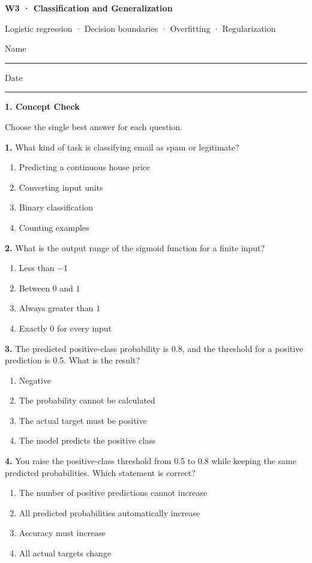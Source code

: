 \documentclass[11pt,a4paper]{article}
\newcommand{\parttitle}[2]{{\large\bfseries\color{ink} #1}\par{\small #2}\par\vspace{5mm}}
\newcommand{\question}[2]{\textbf{#1.} #2\par}
\begin{document}
{\LARGE\bfseries\color{ink} W3 · Classification and Generalization}\par
{\small Logistic regression · Decision boundaries · Overfitting · Regularization}\par
\vspace{3mm}Name\enspace\rule{43mm}{0.3pt}\hfill Date\enspace\rule{35mm}{0.3pt}\par\vspace{3mm}
\parttitle{1. Concept Check}{Choose the single best answer for each question.}
\question{1}{What kind of task is classifying email as spam or legitimate?}
\begin{enumerate}[label=(\arabic*),leftmargin=9mm,itemsep=0pt,topsep=2pt,parsep=0pt]
\item Predicting a continuous house price
\item Converting input units
\item Binary classification
\item Counting examples
\end{enumerate}\vfill
\question{2}{What is the output range of the sigmoid function for a finite input?}
\begin{enumerate}[label=(\arabic*),leftmargin=9mm,itemsep=0pt,topsep=2pt,parsep=0pt]
\item Less than $-1$
\item Between $0$ and $1$
\item Always greater than $1$
\item Exactly $0$ for every input
\end{enumerate}\vfill
\question{3}{The predicted positive-class probability is 0.8, and the threshold for a positive prediction is 0.5. What is the result?}
\begin{enumerate}[label=(\arabic*),leftmargin=9mm,itemsep=0pt,topsep=2pt,parsep=0pt]
\item Negative
\item The probability cannot be calculated
\item The actual target must be positive
\item The model predicts the positive class
\end{enumerate}\vfill
\question{4}{You raise the positive-class threshold from 0.5 to 0.8 while keeping the same predicted probabilities. Which statement is correct?}
\begin{enumerate}[label=(\arabic*),leftmargin=9mm,itemsep=0pt,topsep=2pt,parsep=0pt]
\item The number of positive predictions cannot increase
\item All predicted probabilities automatically increase
\item Accuracy must increase
\item All actual targets change
\end{enumerate}\vfill
\end{document}
